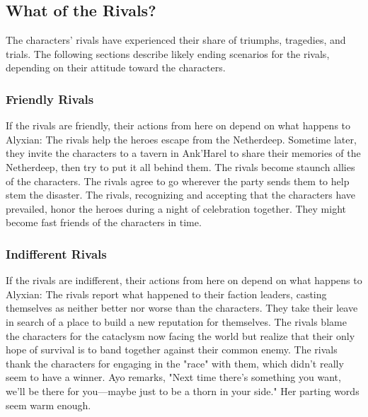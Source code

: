 \documentclass[10pt,a4,twoside,twocolumn,openany,nodeprecatedcode]{dndbook}
\begin{document}
\subsection{What of the Rivals?}
The characters' rivals have experienced their share of triumphs, tragedies, and trials. The following sections describe likely ending scenarios for the rivals, depending on their attitude toward the characters.
\subsubsection{Friendly Rivals}
If the rivals are friendly, their actions from here on depend on what happens to Alyxian:
{{The rivals help the heroes escape from the Netherdeep. Sometime later, they invite the characters to a tavern in Ank'Harel to share their memories of the Netherdeep, then try to put it all behind them.}}
{{The rivals become staunch allies of the characters. The rivals agree to go wherever the party sends them to help stem the disaster.}}
{{The rivals, recognizing and accepting that the characters have prevailed, honor the heroes during a night of celebration together. They might become fast friends of the characters in time.}}
\subsubsection{Indifferent Rivals}
If the rivals are indifferent, their actions from here on depend on what happens to Alyxian:
{{The rivals report what happened to their faction leaders, casting themselves as neither better nor worse than the characters. They take their leave in search of a place to build a new reputation for themselves.}}
{{The rivals blame the characters for the cataclysm now facing the world but realize that their only hope of survival is to band together against their common enemy.}}
{{The rivals thank the characters for engaging in the "race" with them, which didn't really seem to have a winner. Ayo remarks, "Next time there's something you want, we'll be there for you—maybe just to be a thorn in your side." Her parting words seem warm enough.}}
\end{document}
